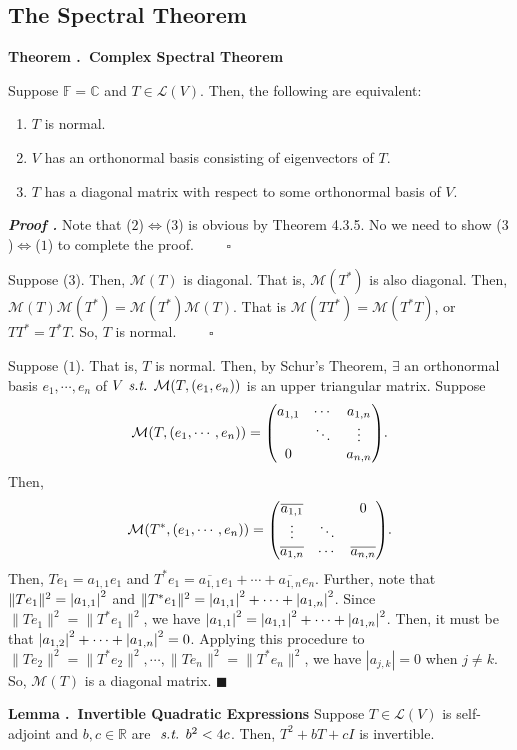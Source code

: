 \documentclass[11pt, letterpaper]{article}
\newcounter{index}[subsection]
\newenvironment*{thm}[1]{\begin{tcolorbox}\par\noindent\textbf{Theorem \thesubsection.\stepcounter{index}\theindex\ #1} \par}{\par\end{tcolorbox}}
\newenvironment*{lem}[1]{\par\noindent\textbf{Lemma \thesubsection.\stepcounter{index}\theindex\ #1}}{\par}
\newcounter{nprf}[subsection]
\newenvironment*{prf}{\par\indent\textbf{\textit{Proof \stepcounter{nprf}\thenprf.}}}{\hfill$\blacksquare$\par}
\def\R{\mathbb{R}}
\def\C{\mathbb{C}}
\def\F{\mathbb{F}}
\def\L{\mathcal{L}}
\def\M{\mathcal{M}}
\def\st{\emph{ s.t. }}
\def\pqde{\qquad\square}
\begin{document}
\newpage
\subsection{The Spectral Theorem}
\begin{thm}{Complex Spectral Theorem}
	Suppose $\F=\C$ and $T\in\L(V)$. Then, the following are equivalent: 
	\begin{enumerate}
		\item $T$ is normal.
		\item $V$ has an orthonormal basis consisting of eigenvectors of $T$.
		\item $T$ has a diagonal matrix with respect to some orthonormal basis of $V$.
	\end{enumerate}
\end{thm}
\begin{prf}
	Note that ($2$)$\iff$($3$) is obvious by Theorem 4.3.5. No we need to show ($3$)$\iff$($1$) to complete the proof. $\pqde$\par 
	Suppose ($3$). Then, $\M(T)$ is diagonal. That is, $\M(T^*)$ is also diagonal. Then, $\M(T)\M(T^*)=\M(T^*)\M(T)$. That is $\M(TT^*)=\M(T^*T)$, or $TT^*=T^*T$. So, $T$ is normal. $\pqde$\par 
	Suppose ($1$). That is, $T$ is normal. Then, by Schur's Theorem, $\exists$ an orthonormal basis $e_1,\cdots,e_n$ of $V\st\M(T,(e_1,e_n))$ is an upper triangular matrix. Suppose \[\M(T,(e_1,\cdots,e_n))=\mqty(a_{1,1}&\cdots&a_{1,n}\\&\ddots&\vdots\\0&&a_{n,n}).\] Then, \[\M(T^*,(e_1,\cdots,e_n))=\mqty(\overline{a_{1,1}}&&0\\\vdots&\ddots&\\\overline{a_{1,n}}&\cdots&\overline{a_{n,n}}).\] Then, $Te_1=a_{1,1}e_1$ and $T^*e_1=\overline{a_{1,1}}e_1+\cdots+\overline{a_{1,n}}e_n$. Further, note that $\|Te_1\|^2=\qty|a_{1,1}|^2$ and $\|T^*e_1\|^2=\qty|a_{1,1}|^2+\cdots+\qty|a_{1,n}|^2$. Since $\|Te_1\|^2=\|T^*e_1\|^2$, we have $\qty|a_{1,1}|^2=\qty|a_{1,1}|^2+\cdots+\qty|a_{1,n}|^2$. Then, it must be that $\qty|a_{1,2}|^2+\cdots+\qty|a_{1,n}|^2=0$. Applying this procedure to $\|Te_2\|^2=\|T^*e_2\|^2,\cdots,\|Te_n\|^2=\|T^*e_n\|^2$, we have $|a_{j,k}|=0$ when $j\neq k$. So, $\M(T)$ is a diagonal matrix. 
\end{prf}
\begin{lem}{Invertible Quadratic Expressions}
	Suppose $T\in\L(V)$ is self-adjoint and $b,c\in\R$ are $\st b^2<4c$. Then, $T^2+bT+cI$ is invertible.	
\end{lem}
\end{document}
